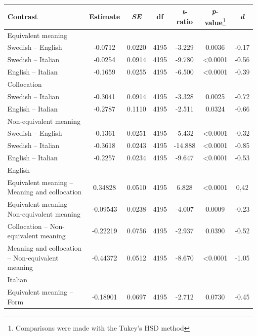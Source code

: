 \documentclass[output=paper,colorlinks,citecolor=brown,nonflat]{langsci/langscibook}
\begin{document}
\begin{table}
\small
    \begin{tabular}{>{\raggedright}p{3.85cm} S[table-format=-1.4] S[table-format=1.4] S[table-format=3.0] S[table-format=-1.4] S[table-format=<1.4] S[table-format=-1.2] }
    \lsptoprule
         Contrast & {Estimate} & {\textit{SE}} & {df} & {\textit{t}-ratio} & {\textit{p}-value\footnote{Comparisons were made with the Tukey’s HSD method}} & {\textit{d}}\\
    \midrule
      Equivalent meaning & & \\
        Swedish -- English & -0.0712 & 0.0220 & 4195 & -3.229 & 0.0036 & -0.17\\
        Swedish -- Italian & -0.0254 & 0.0914 & 4195 & -9.780 & <0.0001 & -0.56\\
        English -- Italian & -0.1659 & 0.0255 & 4195 & -6.500 & <0.0001 & -0.39\\
        \tablevspace
        Collocation & & \\
        Swedish -- Italian & -0.3041 & 0.0914 & 4195 & -3.328 & 0.0025 & -0.72\\
        English -- Italian & -0.2787 & 0.1110 & 4195 & -2.511 & 0.0324 & -0.66\\
        \tablevspace
        Non-equivalent meaning & & \\
        Swedish -- English & -0.1361 & 0.0251 & 4195 & -5.432 & <0.0001 & -0.32\\
        Swedish -- Italian & -0.3618 & 0.0243 & 4195 & -14.888 & <0.0001 & -0.85\\
        English -- Italian & -0.2257 & 0.0234 & 4195 & -9.647 & <0.0001 & -0.53\\
        \tablevspace
        English & & \\
        Equivalent meaning -- Meaning and collocation & 0.34828 & 0.0510 & 4195 & 6.828 & <0.0001 & 0,42\\
        Equivalent meaning -- Non-equivalent meaning & -0.09543 & 0.0238 & 4195 & -4.007 & 0.0009 & -0.23\\
        Collocation -- Non-equivalent meaning & -0.22219 & 0.0756 & 4195 & -2.937 & 0.0390 & -0.52\\
        Meaning and collocation -- Non-equivalent meaning & -0.44372 & 0.0512 & 4195 & -8.670 & <0.0001 & -1.05\\
        \tablevspace
        Italian & & \\
        Equivalent meaning -- Form & -0.18901 & 0.0697 & 4195 & -2.712 & 0.0730 & -0.45\\

\end{tabular}
\end{table}
\end{document}
